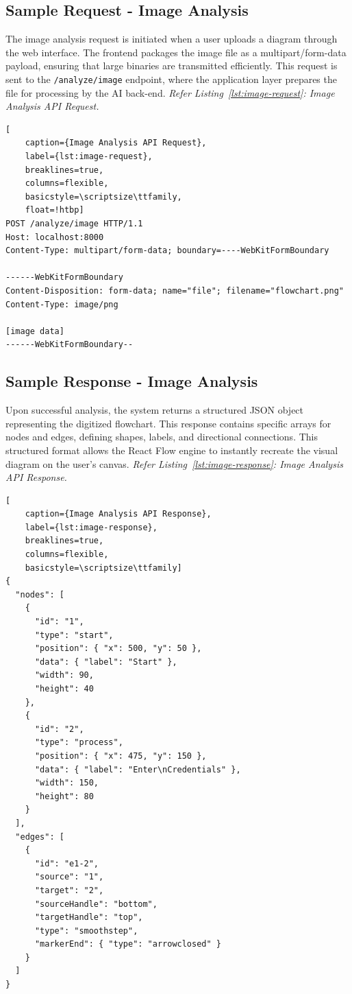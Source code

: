 \subsection{Sample Request - Image Analysis}

\justifying
The image analysis request is initiated when a user uploads a diagram through the web interface. The frontend packages the image file as a multipart/form-data payload, ensuring that large binaries are transmitted efficiently. This request is sent to the \texttt{/analyze/image} endpoint, where the application layer prepares the file for processing by the AI back-end. \textit{Refer Listing~\ref{lst:image-request}: Image Analysis API Request.}

\begin{lstlisting}[
    caption={Image Analysis API Request},
    label={lst:image-request},
    breaklines=true,
    columns=flexible,
    basicstyle=\scriptsize\ttfamily,
    float=!htbp]
POST /analyze/image HTTP/1.1
Host: localhost:8000
Content-Type: multipart/form-data; boundary=----WebKitFormBoundary

------WebKitFormBoundary
Content-Disposition: form-data; name="file"; filename="flowchart.png"
Content-Type: image/png

[image data]
------WebKitFormBoundary--
\end{lstlisting}

\subsection{Sample Response - Image Analysis}

\justifying
Upon successful analysis, the system returns a structured JSON object representing the digitized flowchart. This response contains specific arrays for nodes and edges, defining shapes, labels, and directional connections. This structured format allows the React Flow engine to instantly recreate the visual diagram on the user's canvas. \textit{Refer Listing~\ref{lst:image-response}: Image Analysis API Response.}

\begin{lstlisting}[
    caption={Image Analysis API Response},
    label={lst:image-response},
    breaklines=true,
    columns=flexible,
    basicstyle=\scriptsize\ttfamily]
{
  "nodes": [
    {
      "id": "1",
      "type": "start",
      "position": { "x": 500, "y": 50 },
      "data": { "label": "Start" },
      "width": 90,
      "height": 40
    },
    {
      "id": "2",
      "type": "process",
      "position": { "x": 475, "y": 150 },
      "data": { "label": "Enter\nCredentials" },
      "width": 150,
      "height": 80
    }
  ],
  "edges": [
    {
      "id": "e1-2",
      "source": "1",
      "target": "2",
      "sourceHandle": "bottom",
      "targetHandle": "top",
      "type": "smoothstep",
      "markerEnd": { "type": "arrowclosed" }
    }
  ]
}
\end{lstlisting}



